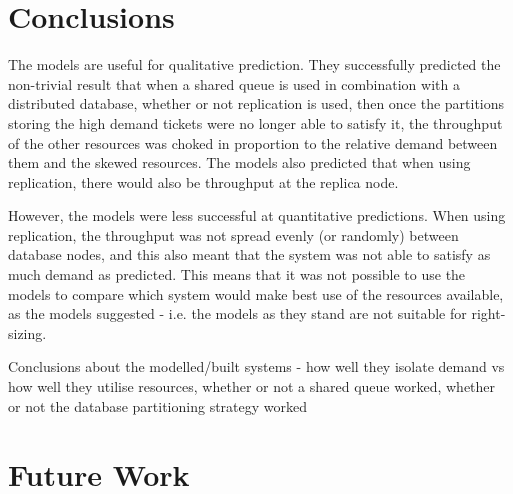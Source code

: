 %
%

\section{Conclusions}\label{sec:conclusions}

\begin{shaded}
	
The models are useful for qualitative prediction.  They successfully predicted the non-trivial result that when a shared queue is used in combination with a distributed database, whether or not replication is used, then once the partitions storing the high demand tickets were no longer able to satisfy it, the throughput of the other resources was choked in proportion to the relative demand between them and the skewed resources.  The models also predicted that when using replication, there would also be throughput at the replica node.

However, the models were less successful at quantitative predictions.  When using replication, the throughput was not spread evenly (or randomly) between database nodes, and this also meant that the system was not able to satisfy as much demand as predicted.  This means that it was not possible to use the models to compare which system would make best use of the resources available, as the models suggested - i.e. the models as they stand are not suitable for right-sizing.

Conclusions about the modelled/built systems - how well they isolate demand vs how well they utilise resources, whether or not a shared queue worked, whether or not the database partitioning strategy worked

\end{shaded}

\section{Future Work}\label{sec:future-work}

